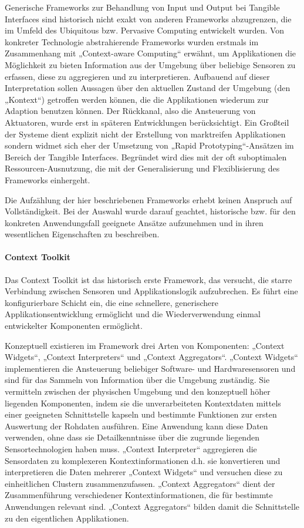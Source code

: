 Generische Frameworks zur Behandlung von Input und Output bei Tangible Interfaces sind historisch nicht exakt von anderen Frameworks abzugrenzen, die im Umfeld des Ubiquitous bzw. Pervasive Computing \citep{Weiser91} entwickelt wurden. Von konkreter Technologie abstrahierende Frameworks wurden erstmals im Zusammenhang mit „Context-aware Computing“ \citep{Schilit94} erwähnt, um Applikationen die Möglichkeit zu bieten Information aus der Umgebung über beliebige Sensoren zu erfassen, diese zu aggregieren und zu interpretieren. Aufbauend auf dieser Interpretation sollen Aussagen über den aktuellen Zustand der Umgebung (den „Kontext“) getroffen werden können, die die Applikationen wiederum zur Adaption benutzen können. Der Rückkanal, also die Ansteuerung von Aktuatoren, wurde erst in späteren Entwicklungen berücksichtigt. Ein Großteil der Systeme dient explizit nicht der Erstellung von marktreifen Applikationen sondern widmet sich eher der Umsetzung von „Rapid Prototyping“-Ansätzen im Bereich der Tangible Interfaces. Begründet wird dies mit der oft suboptimalen Ressourcen-Ausnutzung, die mit der Generalisierung und Flexiblisierung des Frameworks einhergeht. 

Die Aufzählung der hier beschriebenen Frameworks erhebt keinen Anspruch auf Vollständigkeit. Bei der Auswahl wurde darauf geachtet, historische bzw. für den konkreten Anwendungsfall geeignete Ansätze aufzunehmen und in ihren wesentlichen Eigenschaften zu beschreiben.

\paragraph{Context Toolkit} %
\label{par:context_toolkit}
 
Das Context Toolkit \citep{Dey01} ist das historisch erste Framework, das versucht, die starre Verbindung zwischen Sensoren und Applikationslogik aufzubrechen. Es führt eine konfigurierbare Schicht ein, die eine schnellere, generischere Applikationsentwicklung ermöglicht und die Wiederverwendung einmal entwickelter Komponenten ermöglicht.

Konzeptuell existieren im Framework drei Arten von Komponenten: „Context Widgets“, „Context Interpreters“ und „Context Aggregators“. „Context Widgets“ implementieren die Ansteuerung beliebiger Software- und Hardwaresensoren und sind für das Sammeln von Information über die Umgebung zuständig. Sie vermitteln zwischen der physischen Umgebung und den konzeptuell höher liegenden Komponenten, indem sie die unverarbeiteten Kontextdaten mittels einer geeigneten Schnittstelle kapseln und bestimmte Funktionen zur ersten Auswertung der Rohdaten ausführen. Eine Anwendung kann diese Daten verwenden, ohne dass sie Detailkenntnisse über die zugrunde liegenden Sensortechnologien haben muss. „Context Interpreter“ aggregieren die Sensordaten zu komplexeren Kontextinformationen d.h. sie konvertieren und interpretieren die Daten mehrerer „Context Widgets“ und versuchen diese zu einheitlichen Clustern zusammenzufassen. „Context Aggregators“ dient der Zusammenführung verschiedener Kontextinformationen, die für bestimmte Anwendungen relevant sind. „Context Aggregators“ bilden damit die Schnittstelle zu den eigentlichen Applikationen.

